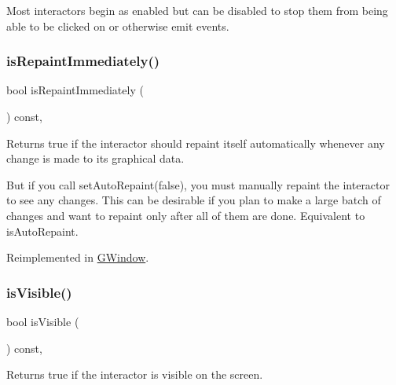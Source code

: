 Most interactors begin as enabled but can be disabled to stop them from being able to be clicked on or otherwise emit events. \mbox{\label{classsgl_1_1GDrawingSurface_a82a00267c81cc0ae85ee0feb01a92fa8}} 
\subsubsection{\texorpdfstring{is\+Repaint\+Immediately()}{isRepaintImmediately()}}
{\footnotesize\ttfamily bool is\+Repaint\+Immediately (\begin{DoxyParamCaption}{ }\end{DoxyParamCaption}) const\hspace{0.3cm}{\ttfamily [virtual]}, {\ttfamily [inherited]}}



Returns true if the interactor should repaint itself automatically whenever any change is made to its graphical data. 

But if you call set\+Auto\+Repaint(false), you must manually repaint the interactor to see any changes. This can be desirable if you plan to make a large batch of changes and want to repaint only after all of them are done. Equivalent to is\+Auto\+Repaint. 

Reimplemented in \mbox{\hyperlink{classsgl_1_1GWindow_a45b1955433b8bf8a449a216b847d87f7}{G\+Window}}.

\mbox{\label{classsgl_1_1GInteractor_a9d8a6cfb13917785c143e74d40e4e2be}} 
\subsubsection{\texorpdfstring{is\+Visible()}{isVisible()}}
{\footnotesize\ttfamily bool is\+Visible (\begin{DoxyParamCaption}{ }\end{DoxyParamCaption}) const\hspace{0.3cm}{\ttfamily [virtual]}, {\ttfamily [inherited]}}



Returns true if the interactor is visible on the screen. 

